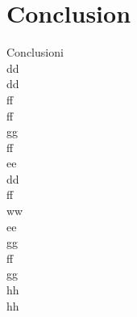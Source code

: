 \section*{Conclusion}
Conclusioni\\
dd\\
dd\\
ff\\
ff\\
gg\\
ff\\
ee\\
dd\\
ff\\
ww\\
ee\\
gg\\
ff\\
gg\\
hh\\
hh